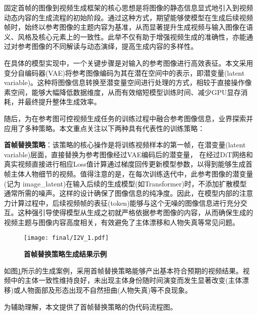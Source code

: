 固定首帧的图像到视频生成框架的核心思想是将图像的静态信息显式地引入到视频动态内容的生成流程的初始阶段。通过这种方式，期望能够使模型在生成后续视频帧时，始终以参考图像的主题内容为基准，从而显著提升生成视频与输入图像在语义、风格及核心元素上的一致性。此举不仅有助于增强视频生成的准确性，亦能通过对参考图像的不同解读与动态演绎，提高生成内容的多样性。

在具体的模型实现中，一个关键步骤是对输入的参考图像进行高效表征。本文采用变分自编码器(VAE)将参考图像编码为其在潜在空间中的表示，即潜变量(latent variable)。这种将图像信息转换至潜变量空间进行处理的方式，相较于直接操作像素空间，能够大幅降低数据维度，从而有效缩短模型训练时间、减少GPU显存消耗，并最终提升整体生成效率。

随后，为在参考图可控视频生成任务的训练过程中融合参考图像信息，业界探索并应用了多种策略。本文重点关注以下两种具有代表性的训练策略：

\textbf{首帧替换策略}：该策略的核心操作是将训练视频样本的第一帧，在潜变量(latent variable)层面，直接替换为参考图像经过VAE编码后的潜变量， 在经过DiT网络和真实视频直接进行相应Loss值计算通过梯度回传更新模型参数，以得到能够生成首帧主体人物细节的视频。值得注意的是，在每次训练迭代中，此参考图像的潜变量(记为 image\_latent)在输入后续的生成模型(如Transformer)时，不添加扩散模型通常所需的噪声。这样的设计确保了图像信息的纯净度。因此，在模型内部的注意力计算过程中，后续视频帧的表征(token)能够与这个无噪的图像信息进行充分交互。这种强引导使得模型从生成之初就严格依据参考图像的内容，从而确保生成的视频主题与图像内容高度相关，有效避免了主体漂移和人物失真等常见问题。
 
\begin{figure}[htbp]
    \centering
    \texttt{[image: final/I2V\_1.pdf]}
    \caption{\textbf{首帧替换策略生成结果示例}}
    \label{I2V_1}
\end{figure}

如图\ref{I2V_1}所示的生成案例，采用首帧替换策略能够产出基本符合预期的视频结果。视频中的主体一致性维持良好，未出现主体身份随时间演变而发生显著改变(主体漂移)或人物面部及形态出现不自然扭曲(人物失真)等不良现象。

为辅助理解，本文提供了首帧替换策略的伪代码流程图。

